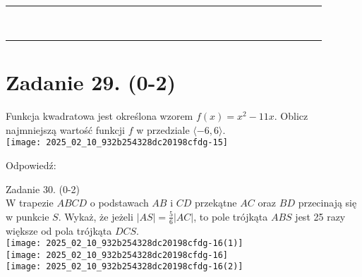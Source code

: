 \documentclass[10pt]{article}
\begin{document}
\begin{center}
\begin{tabular}{|c|c|c|c|c|c|c|c|c|c|c|c|c|c|c|c|c|c|c|c|c|c|c|c|c|c|c|c|}
\hline
 &  &  &  &  &  &  &  &  &  &  &  &  &  &  &  &  &  &  &  &  &  &  &  &  &  &  &  \\
\hline
 &  &  &  &  &  &  &  &  &  &  &  &  &  &  &  &  &  &  &  &  &  &  &  &  &  &  &  \\
\hline
 &  &  &  &  &  &  &  &  &  &  &  &  &  &  &  &  &  &  &  &  &  &  &  &  &  &  &  \\
\hline
 &  &  &  &  &  &  &  &  &  &  &  &  &  &  &  &  &  &  &  &  &  &  &  &  &  &  &  \\
\hline
 &  &  &  &  &  &  &  &  &  &  &  &  &  &  &  &  &  &  &  &  &  &  &  &  &  &  &  \\
\hline
 &  &  &  &  &  &  &  &  &  &  &  &  &  &  &  &  &  &  &  &  &  &  &  &  &  &  &  \\
\hline
 &  &  &  &  &  &  &  &  &  &  &  &  &  &  &  &  &  &  &  &  &  &  &  &  &  &  &  \\
\hline
 &  &  &  &  &  &  &  &  &  &  &  &  &  &  &  &  &  &  &  &  &  &  &  &  &  &  &  \\
\hline
 &  &  &  &  &  &  &  &  &  &  &  &  &  &  &  &  &  &  &  &  &  &  &  &  &  &  &  \\
\hline
\end{tabular}
\end{center}

\section*{Zadanie 29. (0-2)}
Funkcja kwadratowa jest określona wzorem \(f(x)=x^{2}-11 x\). Oblicz najmniejszą wartość funkcji \(f\) w przedziale \(\langle-6,6\rangle\).\\
\texttt{[image: 2025\_02\_10\_932b254328dc20198cfdg-15]}

Odpowiedź:

Zadanie 30. (0-2)\\
W trapezie \(A B C D\) o podstawach \(A B\) i \(C D\) przekątne \(A C\) oraz \(B D\) przecinają się w punkcie \(S\). Wykaż, że jeżeli \(|A S|=\frac{5}{6}|A C|\), to pole trójkąta \(A B S\) jest 25 razy większe od pola trójkąta \(D C S\).\\
\(\qquad\)\\
\texttt{[image: 2025\_02\_10\_932b254328dc20198cfdg-16(1)]}\\
\(\qquad\)\\
\texttt{[image: 2025\_02\_10\_932b254328dc20198cfdg-16]}\\
\(\qquad\)\\
\texttt{[image: 2025\_02\_10\_932b254328dc20198cfdg-16(2)]}\\
\(\qquad\)
\end{document}
